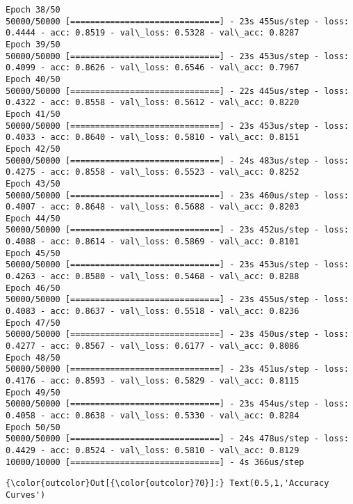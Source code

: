 \documentclass[11pt]{article}
\begin{document}
\begin{Verbatim}[commandchars=\\\{\}]
Epoch 38/50
50000/50000 [==============================] - 23s 455us/step - loss: 0.4444 - acc: 0.8519 - val\_loss: 0.5328 - val\_acc: 0.8287
Epoch 39/50
50000/50000 [==============================] - 23s 453us/step - loss: 0.4099 - acc: 0.8626 - val\_loss: 0.6546 - val\_acc: 0.7967
Epoch 40/50
50000/50000 [==============================] - 22s 445us/step - loss: 0.4322 - acc: 0.8558 - val\_loss: 0.5612 - val\_acc: 0.8220
Epoch 41/50
50000/50000 [==============================] - 23s 453us/step - loss: 0.4033 - acc: 0.8640 - val\_loss: 0.5810 - val\_acc: 0.8151
Epoch 42/50
50000/50000 [==============================] - 24s 483us/step - loss: 0.4275 - acc: 0.8558 - val\_loss: 0.5523 - val\_acc: 0.8252
Epoch 43/50
50000/50000 [==============================] - 23s 460us/step - loss: 0.4007 - acc: 0.8648 - val\_loss: 0.5688 - val\_acc: 0.8203
Epoch 44/50
50000/50000 [==============================] - 23s 452us/step - loss: 0.4088 - acc: 0.8614 - val\_loss: 0.5869 - val\_acc: 0.8101
Epoch 45/50
50000/50000 [==============================] - 23s 453us/step - loss: 0.4263 - acc: 0.8580 - val\_loss: 0.5468 - val\_acc: 0.8288
Epoch 46/50
50000/50000 [==============================] - 23s 455us/step - loss: 0.4083 - acc: 0.8637 - val\_loss: 0.5518 - val\_acc: 0.8236
Epoch 47/50
50000/50000 [==============================] - 23s 450us/step - loss: 0.4277 - acc: 0.8567 - val\_loss: 0.6177 - val\_acc: 0.8086
Epoch 48/50
50000/50000 [==============================] - 23s 451us/step - loss: 0.4176 - acc: 0.8593 - val\_loss: 0.5829 - val\_acc: 0.8115
Epoch 49/50
50000/50000 [==============================] - 23s 454us/step - loss: 0.4058 - acc: 0.8638 - val\_loss: 0.5330 - val\_acc: 0.8284
Epoch 50/50
50000/50000 [==============================] - 24s 478us/step - loss: 0.4429 - acc: 0.8524 - val\_loss: 0.5810 - val\_acc: 0.8129
10000/10000 [==============================] - 4s 366us/step

    \end{Verbatim}

\begin{Verbatim}[commandchars=\\\{\}]
{\color{outcolor}Out[{\color{outcolor}70}]:} Text(0.5,1,'Accuracy Curves')
\end{Verbatim}
            
    \begin{center}
    \end{center}
    { \hspace*{\fill} \\}
    
\end{document}
